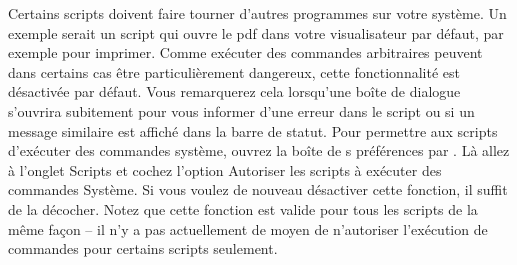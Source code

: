 Certains scripts doivent faire tourner d'autres programmes sur votre système. Un exemple serait un script qui ouvre le pdf dans votre visualisateur par défaut, par exemple pour imprimer. Comme exécuter des commandes arbitraires peuvent dans certains cas être particulièrement dangereux, cette fonctionnalité est désactivée par défaut. Vous remarquerez cela lorsqu'une boîte de dialogue s'ouvrira subitement pour vous informer d'une erreur dans le script ou si un message similaire est affiché dans la barre de statut. Pour permettre aux scripts d'exécuter des commandes système, ouvrez la boîte de s préférences par \submenu{}. Là allez à l'onglet \og Scripts\fg{} et cochez l'option \og Autoriser les scripts à exécuter des commandes Système\fg. Si vous voulez de nouveau désactiver cette fonction, il suffit de la décocher. Notez que cette fonction est valide pour tous les scripts de la même façon -- il n'y a pas actuellement de moyen de n'autoriser l'exécution de commandes pour certains scripts seulement.

